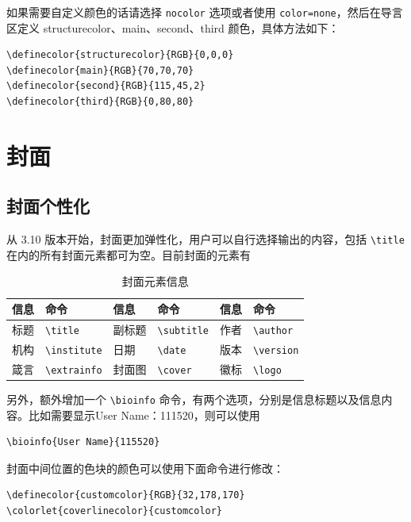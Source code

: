 \documentclass[lang=cn,10pt]{elegantbook}
\begin{document}
如果需要自定义颜色的话请选择 \lstinline{nocolor} 选项或者使用 \lstinline{color=none}，然后在导言区定义 structurecolor、main、second、third 颜色，具体方法如下：
\begin{lstlisting}[tabsize=4]
\definecolor{structurecolor}{RGB}{0,0,0}
\definecolor{main}{RGB}{70,70,70}    
\definecolor{second}{RGB}{115,45,2}    
\definecolor{third}{RGB}{0,80,80}
\end{lstlisting}

\section{封面}

\subsection{封面个性化}

从 3.10 版本开始，封面更加弹性化，用户可以自行选择输出的内容，包括 \lstinline{\title} 在内的所有封面元素都可为空。目前封面的元素有

\begin{table}[htbp]
  \centering
  \caption{封面元素信息}
  \begin{tabular}{p{}p{}|p{}p{}|p{}p{}}
    \toprule
    信息 & 命令 & 信息 & 命令 & 信息 & 命令 \\
    \midrule
    标题 & \lstinline|\title| & 副标题 & \lstinline|\subtitle| & 作者 & \lstinline|\author| \\
    机构 & \lstinline|\institute| & 日期 &  \lstinline|\date| & 版本 & \lstinline|\version| \\
    箴言 & \lstinline|\extrainfo| & 封面图 & \lstinline|\cover| & 徽标 & \lstinline|\logo| \\
    \bottomrule
  \end{tabular}
\end{table}

另外，额外增加一个 \lstinline{\bioinfo} 命令，有两个选项，分别是信息标题以及信息内容。比如需要显示{\kaishu User Name：111520}，则可以使用 
\begin{lstlisting}
\bioinfo{User Name}{115520}
\end{lstlisting}

封面中间位置的色块的颜色可以使用下面命令进行修改：
\begin{lstlisting}
\definecolor{customcolor}{RGB}{32,178,170}
\colorlet{coverlinecolor}{customcolor}
\end{lstlisting}
\end{document}
